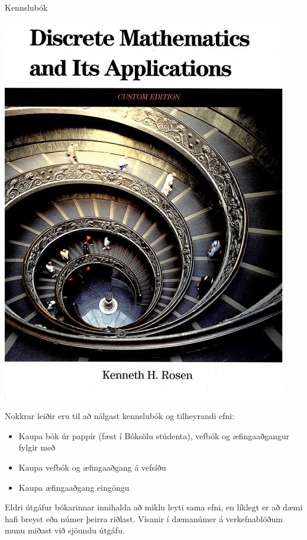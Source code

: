 \documentclass[justified, nobib]{tufte-handout}
\begin{document}
\begin{marginfigure}
    \caption{Kennslubók}
    \includegraphics[width=\linewidth]{Pics/rosen}
\end{marginfigure}

Nokkrar leiðir eru til að nálgast kennslubók og tilheyrandi efni:
\begin{itemize}
    \item Kaupa bók úr pappír (fæst í Bóksölu stúdenta), vefbók og æfingaaðgangur fylgir með
    \item Kaupa vefbók og æfingaaðgang á vefsíðu
    \item Kaupa æfingaaðgang eingöngu
\end{itemize}
Eldri útgáfur bókarinnar innihalda að miklu leyti sama efni, en líklegt er að dæmi hafi breyst eða númer þeirra riðlast. Vísanir í dæmanúmer á verkefnablöðum munu miðast við sjöundu útgáfu.
\end{document}
